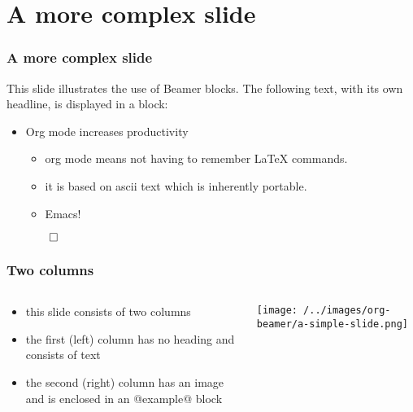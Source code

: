 \documentclass[bigger]{beamer}
\begin{document}
\section{A more complex slide}
\label{sec-2}
\begin{frame}
\frametitle{A more complex slide}
\label{sec-2-1}

This slide illustrates the use of Beamer blocks.  The following text,
with its own headline, is displayed in a block:
\begin{itemize}

\item Org mode increases productivity
\label{sec-2-1-1}%
\begin{itemize}
\item org mode means not having to remember \LaTeX{} commands.
\item it is based on ascii text which is inherently portable.
\item Emacs!
\end{itemize}

    \hfill \(\qed\)

\end{itemize} %
\end{frame}
\begin{frame}
\frametitle{Two columns}
\label{sec-2-2}
\begin{columns}
\begin{column}{0.4\textwidth}
\label{sec-2-2-1}

\begin{itemize}
\item this slide consists of two columns
\item the first (left) column has no heading and consists of text
\item the second (right) column has an image and is enclosed in an
      @example@ block
\end{itemize}
\end{column}
\begin{column}{0.6\textwidth}
\begin{example}[A screenshot]
\label{sec-2-2-2}

    \texttt{[image: /../images/org-beamer/a-simple-slide.png]}
\end{example}
\end{column}
\end{columns}
\end{frame}
\end{document}
